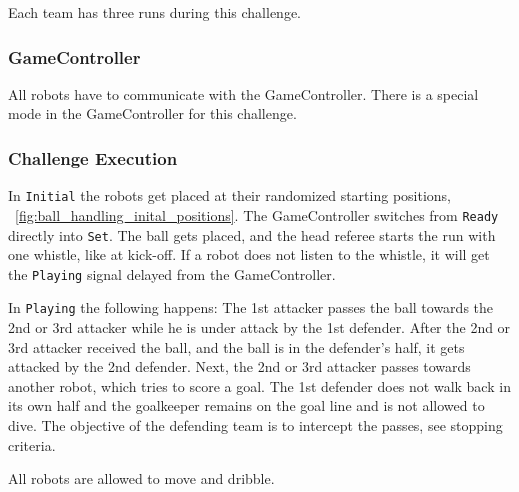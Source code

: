     Each team has three runs during this challenge.

    \subsubsection{GameController}
        All robots have to communicate with the GameController. There is a special mode in the GameController for this challenge. 

    \subsubsection{Challenge Execution}

        In \texttt{Initial} the robots get placed at their randomized starting positions, \cf~\cref{fig:ball_handling_inital_positions}. The GameController switches from \texttt{Ready} directly into \texttt{Set}. The ball gets placed, and the head referee starts the run with one whistle, like at kick-off. If a robot does not listen to the whistle, it will get the \texttt{Playing} signal delayed from the GameController.

        In \texttt{Playing} the following happens: The 1st attacker passes the ball towards the 2nd or 3rd attacker while he is under attack by the 1st defender. After the 2nd or 3rd attacker received the ball, and the ball is in the defender's half, it gets attacked by the 2nd defender. Next, the 2nd or 3rd attacker passes towards another robot, which tries to score a goal.
        The 1st defender does not walk back in its own half and the goalkeeper remains on the goal line and is not allowed to dive. The objective of the defending team is to intercept the passes, see stopping criteria.

        All robots are allowed to move and dribble.

